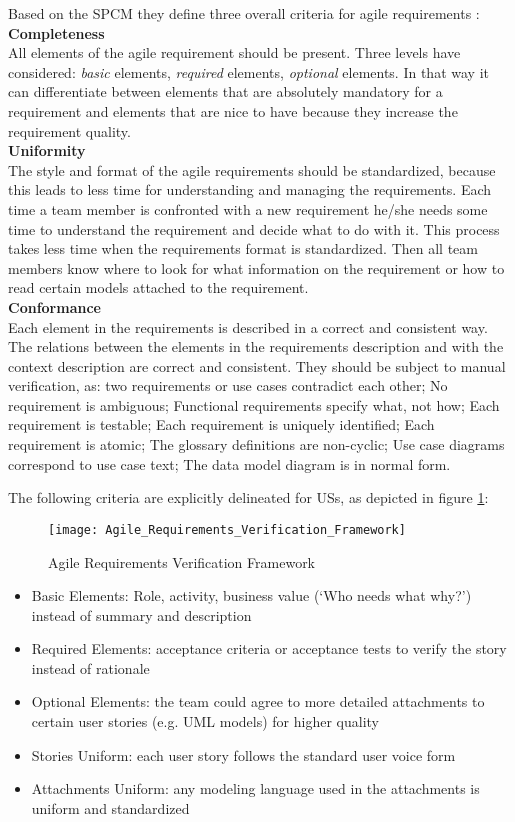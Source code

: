Based on the SPCM they define three overall criteria for agile requirements \cite{heck2014quality}: 
\textbf{Completeness}\\ 
All elements of the agile requirement should be present. Three levels have considered: \emph{basic} elements, \emph{required} elements, \emph{optional }elements. In that way it can differentiate between elements that are absolutely mandatory for a requirement and elements that are nice to have because they increase the requirement quality. \\ 
\textbf{Uniformity}\\ 
The style and format of the agile requirements should be standardized, because this leads to less time for understanding and managing the requirements. Each time a team member is confronted with a new requirement he/she needs some time to understand the requirement and decide what to do with it. This process takes less time when the requirements format is standardized. Then all team members know where to look for what information on the requirement or how to read certain models attached to the requirement. \\ 
\textbf{Conformance}\\ 
Each element in the requirements is described in a correct and consistent way. The relations between the elements in the requirements description and with the context description are correct and consistent. They should be subject to manual verification, as: two requirements or use cases contradict each other; No requirement is ambiguous; Functional requirements specify what, not how; Each requirement is testable; Each requirement is uniquely identiﬁed; Each requirement is atomic; The glossary deﬁnitions are non-cyclic; Use case diagrams correspond to use case text; The data model diagram is in normal form.

The following criteria are explicitly delineated for USs, as depicted in figure \ref{fig:arvf}:
\begin{figure}
\center
\texttt{[image: Agile\_Requirements\_Verification\_Framework]}
\caption{Agile Requirements Verification Framework \cite{heck2014quality}}\label{fig:arvf}
\end{figure}


\begin{itemize}
\item Basic Elements: Role, activity, business value (‘Who needs what why?’) instead of summary and description
\item Required Elements: acceptance criteria or acceptance tests to verify the story instead of rationale
\item Optional Elements: the team could agree to more detailed attachments to certain user stories (e.g. UML models) for higher quality
\item Stories Uniform: each user story follows the standard user voice form
\item Attachments Uniform: any modeling language used in the attachments is uniform and standardized
\end{itemize}


